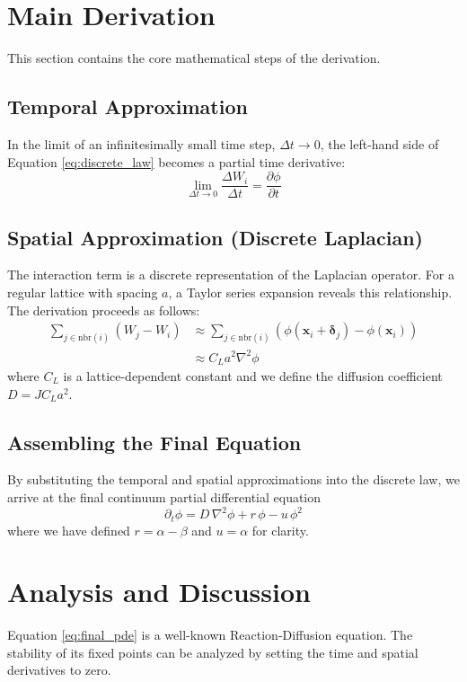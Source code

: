 \documentclass[11pt, letterpaper]{article}
\begin{document}
\section{Main Derivation}
This section contains the core mathematical steps of the derivation.

\subsection{Temporal Approximation}
In the limit of an infinitesimally small time step, $\Delta t \to 0$, the left-hand side of Equation \ref{eq:discrete_law} becomes a partial time derivative:
\begin{equation}
    \lim_{\Delta t \to 0} \frac{\Delta W_i}{\Delta t} = \frac{\partial \phi}{\partial t}
\end{equation}

\subsection{Spatial Approximation (Discrete Laplacian)}
The interaction term is a discrete representation of the Laplacian operator. For a regular lattice with spacing $a$, a Taylor series expansion reveals this relationship. The derivation proceeds as follows:
\begin{align}
    \sum_{j\in \mathrm{nbr}(i)} (W_j - W_i) &\approx \sum_{j\in \mathrm{nbr}(i)} \left( \phi(\mathbf{x}_i + \mathbf{\delta}_j) - \phi(\mathbf{x}_i) \right) \\
    &\approx C_L a^2 \nabla^2 \phi
\end{align}
where $C_L$ is a lattice-dependent constant and we define the diffusion coefficient $D = J C_L a^2$.

\subsection{Assembling the Final Equation}
By substituting the temporal and spatial approximations into the discrete law, we arrive at the final continuum partial differential equation
\begin{equation}
    \partial_t \phi = D\, \nabla^{2}\phi + r\, \phi - u\, \phi^{2}
    \label{eq:final_pde}
\end{equation}
where we have defined $r = \alpha - \beta$ and $u = \alpha$ for clarity.

\section{Analysis and Discussion}
\lipsum[2] %
Equation \ref{eq:final_pde} is a well-known Reaction-Diffusion equation. The stability of its fixed points can be analyzed by setting the time and spatial derivatives to zero.
\end{document}
